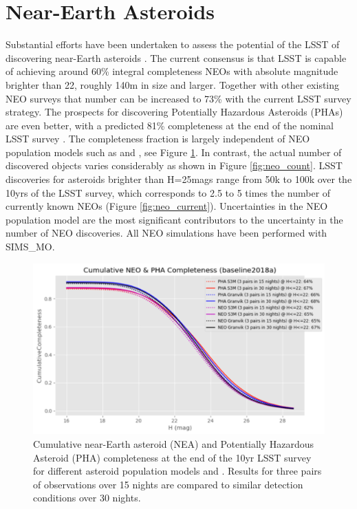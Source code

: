 \section{Near-Earth Asteroids}\label{sec:neo}
Substantial efforts have been undertaken to assess the potential of the LSST of discovering near-Earth asteroids \citep[e.g.][]{ivezic2006lsst,jones2015asteroid,grav2016modeling,veres2017near,veres2017high,jones2018large,ivezic2019lsst}. The current consensus is that LSST is capable of achieving around 60\% integral completeness NEOs with absolute magnitude brighter than 22, roughly 140m in size and larger. Together with other existing NEO surveys that number can be increased to 73\% with the current LSST survey strategy. The prospects for discovering Potentially Hazardous Asteroids (PHAs) are even better, with a predicted 81\% completeness at the end of the nominal LSST survey \citep{ivezic2019lsst}. The completeness fraction is largely independent of NEO population models such as \citep[S3M,][]{s3m} and \citet{granvik2018neos}, see Figure \ref{fig:neo_compl}. In contrast, the actual number of discovered objects varies considerably as shown in Figure \ref{fig:neo_count}. LSST discoveries for asteroids brighter than H=25mags range from 50k to 100k over the 10yrs of the LSST survey, which corresponds to 2.5 to 5 times the number of currently known NEOs (Figure \ref{fig:neo_current}).
Uncertainties in the NEO population model are the most significant contributors to the uncertainty in the number of NEO discoveries. All NEO simulations have been performed with SIMS\_MO.
\begin{figure}[tb!]
\begin{center}
\includegraphics[width=0.65\linewidth]{figs/neo2.png}
\end{center}
\caption{Cumulative near-Earth asteroid (NEA) and Potentially Hazardous Asteroid (PHA) completeness at the end of the 10yr LSST survey for different asteroid population models \citep[S3M,][]{s3m} and \citet{granvik2018neos}. Results for three pairs of observations over 15 nights are compared to similar detection conditions over 30 nights.}
\label{fig:neo_compl}       %
\end{figure}

